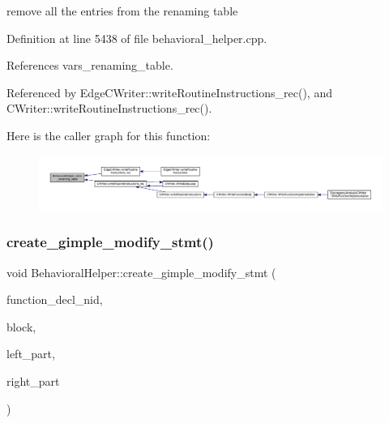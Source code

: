 remove all the entries from the renaming table 



Definition at line 5438 of file behavioral\+\_\+helper.\+cpp.



References vars\+\_\+renaming\+\_\+table.



Referenced by Edge\+C\+Writer\+::write\+Routine\+Instructions\+\_\+rec(), and C\+Writer\+::write\+Routine\+Instructions\+\_\+rec().

Here is the caller graph for this function\+:
\nopagebreak
\begin{figure}[H]
\begin{center}
\leavevmode
\includegraphics[width=350pt]{dd/db2/classBehavioralHelper_a18f5452ae64b9e359fe631cf34740f08_icgraph}
\end{center}
\end{figure}
\mbox{\label{classBehavioralHelper_a7267b33554b8783cbe44b7b72f2590df}} 
\subsubsection{\texorpdfstring{create\+\_\+gimple\+\_\+modify\+\_\+stmt()}{create\_gimple\_modify\_stmt()}}
{\footnotesize\ttfamily void Behavioral\+Helper\+::create\+\_\+gimple\+\_\+modify\+\_\+stmt (\begin{DoxyParamCaption}\item[{unsigned int}]{function\+\_\+decl\+\_\+nid,  }\item[{bloc\+Ref \&}]{block,  }\item[{\hyperlink{tree__node_8hpp_a6ee377554d1c4871ad66a337eaa67fd5}{tree\+\_\+node\+Ref}}]{left\+\_\+part,  }\item[{\hyperlink{tree__node_8hpp_a6ee377554d1c4871ad66a337eaa67fd5}{tree\+\_\+node\+Ref}}]{right\+\_\+part }\end{DoxyParamCaption})\hspace{0.3cm}{\ttfamily [virtual]}}



